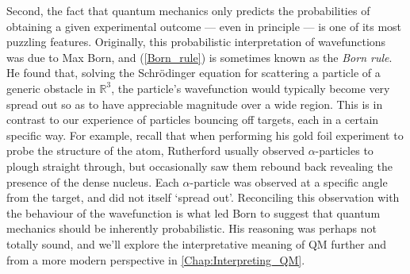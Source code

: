 \documentclass{article}
\theoremstyle{plain}\theoremheaderfont{\normalfont\itshape}\theorembodyfont{\rmfamily}\theoremseparator{.}\newtheorem*{rem}{Remark}\newtheorem*{ex}{Example}\newtheorem*{proof}{Proof}\newtheorem*{altp}{Alternative proof}
\theoremstyle{plain}\theoremheaderfont{\normalfont\bfseries}\theorembodyfont{\rmfamily}\theoremseparator{.}\newtheorem{thm}{Theorem}[section]\newtheorem{lem}[thm]{Lemma}\newtheorem{prop}[thm]{Proposition}\newtheorem*{cor}{Corollary}\newtheorem{defn}[thm]{Definition}\newtheorem{clm}[thm]{Claim}\newtheorem{clminproof}{Claim}
\theoremstyle{break}\theoremheaderfont{\normalfont\itshape}\theorembodyfont{\rmfamily}\theoremseparator{.\medskip}\newtheorem*{proofskip}{Proof}\newtheorem*{exs}{Examples}\newtheorem*{rems}{Remarks}
\theoremstyle{break}\theoremheaderfont{\normalfont\bfseries}\theorembodyfont{\rmfamily}\theoremseparator{.\medskip}\newtheorem{lemskip}[thm]{Lemma}\newtheorem{defnskip}[thm]{Definition}\newtheorem{propskip}[thm]{Proposition}\newtheorem{thmskip}[thm]{Theorem}
\numberwithin{equation}{section}
\newcommand{\RR}{\mathbb{R}}
\begin{document}
    Second, the fact that quantum mechanics only predicts the probabilities of obtaining a given experimental outcome --- even in principle --- is one of its most puzzling features. Originally, this probabilistic interpretation of wavefunctions was due to Max Born, and (\ref{Born_rule}) is sometimes known as the \textit{Born rule}. He found that, solving the Schr\"{o}dinger equation for scattering a particle of a generic obstacle in \(\RR^3\), the particle's wavefunction would typically become very spread out so as to have appreciable magnitude over a wide region. This is in contrast to our experience of particles bouncing off targets, each in a certain specific way. For example, recall that when performing his gold foil experiment to probe the structure of the atom, Rutherford usually observed \(\alpha\)-particles to plough straight through, but occasionally saw them rebound back revealing the presence of the dense nucleus. Each \(\alpha\)-particle was observed at a specific angle from the target, and did not itself `spread out'. Reconciling this observation with the behaviour of the wavefunction is what led Born to suggest that quantum mechanics should be inherently probabilistic. His reasoning was perhaps not totally sound, and we'll explore the interpretative meaning of QM further and from a more modern perspective in \cref{Chap:Interpreting_QM}.
\end{document}
